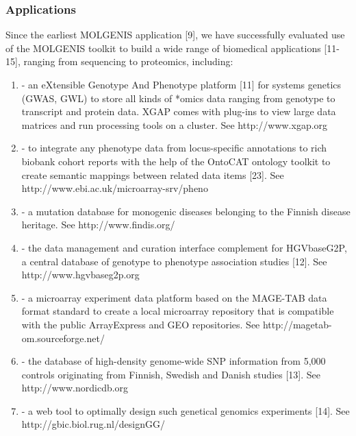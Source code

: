 \subsubsection{Applications}
Since the earliest MOLGENIS application [9], we have successfully evaluated use of the MOLGENIS 
toolkit to build a wide range of biomedical applications [11-15], ranging from sequencing to 
proteomics, including:

\begin{enumerate}\itemsep1pt
\item {} - an eXtensible Genotype And Phenotype platform [11] for systems genetics 
(GWAS, GWL) to store all kinds of *omics data ranging from genotype to transcript and protein 
data. XGAP comes with plug-ins to view large data matrices and run processing tools on a cluster. 
See http://www.xgap.org
\item {} - to integrate any phenotype data from locus-specific annotations to 
rich biobank cohort reports with the help of the OntoCAT ontology toolkit to create semantic 
mappings between related data items [23]. See http://www.ebi.ac.uk/microarray-srv/pheno
\item {} - a mutation database for monogenic diseases belonging to the Finnish 
disease heritage. See http://www.findis.org/
\item {} - the data management and curation interface complement for HGVbaseG2P, 
a central database of genotype to phenotype association studies [12]. See http://www.hgvbaseg2p.org
\item {} - a microarray experiment data platform based on the MAGE-TAB data format 
standard to create a local microarray repository that is compatible with the public ArrayExpress 
and GEO repositories. See http://magetab-om.sourceforge.net/ 
\item {} - the database of high-density genome-wide SNP information from 5,000 
controls originating from Finnish, Swedish and Danish studies [13]. See http://www.nordicdb.org
\item {} - a web tool to optimally design such genetical genomics experiments [14]. 
See http://gbic.biol.rug.nl/designGG/
\end{enumerate}

